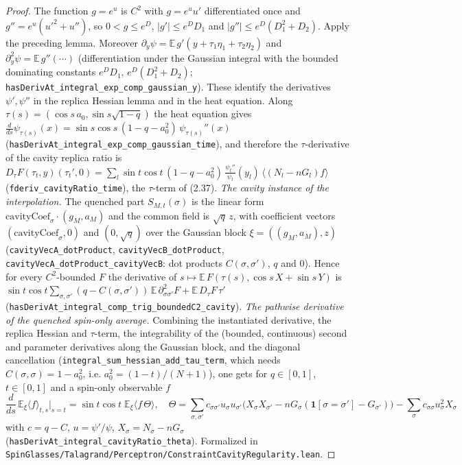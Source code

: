 \begin{proof}
  \leanok
The function $g=e^u$ is $C^2$ with $g=e^u u'$ differentiated once and $g''=e^u(u'^2+u'')$, so $0<g\le e^D$, $|g'|\le e^DD_1$ and $|g''|\le e^D(D_1^2+D_2)$. Apply the preceding lemma.
Moreover $\partial_y\psi=\mathbb E\,g'(y+\tau_1\eta_1+\tau_2\eta_2)$ and $\partial_y^2\psi=\mathbb E\,g''(\cdots)$ (differentiation under the Gaussian integral with the bounded dominating constants $e^DD_1$, $e^D(D_1^2+D_2)$; \texttt{hasDerivAt\_integral\_exp\_comp\_gaussian\_y}). These identify the derivatives $\psi',\psi''$ in the replica Hessian lemma and in the heat equation.
Along $\tau(s)=(\cos s\,a_0,\sin s\sqrt{1-q})$ the heat equation gives $\frac d{ds}\psi_{\tau(s)}(x)=\sin s\cos s\,(1-q-a_0^2)\,\psi_{\tau(s)}''(x)$ (\texttt{hasDerivAt\_integral\_exp\_comp\_gaussian\_time}), and therefore the $\tau$-derivative of the cavity replica ratio is $D_\tau F(\tau_t,y)(\tau_t',0)=\sum_l\sin t\cos t\,(1-q-a_0^2)\,\frac{\psi_t''}{\psi_t}(y_l)\,\langle(N_l-nG_l)f\rangle$ (\texttt{fderiv\_cavityRatio\_time}), the $\tau$-term of (2.37).
\emph{The cavity instance of the interpolation.} The quenched part $S_{M,t}(\sigma)$ is the linear form $\mathrm{cavityCoef}_\sigma\cdot(g_M,a_M)$ and the common field is $\sqrt q\,z$, with coefficient vectors $(\mathrm{cavityCoef}_\sigma,0)$ and $(0,\sqrt q)$ over the Gaussian block $\xi=((g_M,a_M),z)$ (\texttt{cavityVecA\_dotProduct}, \texttt{cavityVecB\_dotProduct}, \texttt{cavityVecA\_dotProduct\_cavityVecB}: dot products $C(\sigma,\sigma')$, $q$ and $0$). Hence for every $C^2$-bounded $F$ the derivative of $s\mapsto\mathbb E\,F(\tau(s),\cos s\,X+\sin s\,Y)$ is $\sin t\cos t\sum_{\sigma,\sigma'}(q-C(\sigma,\sigma'))\,\mathbb E\,\partial^2_{\sigma\sigma'}F+\mathbb E\,D_\tau F\,\tau'$ (\texttt{hasDerivAt\_integral\_comp\_trig\_boundedC2\_cavity}).
\emph{The pathwise derivative of the quenched spin-only average.} Combining the instantiated derivative, the replica Hessian and $\tau$-term, the integrability of the (bounded, continuous) second and parameter derivatives along the Gaussian block, and the diagonal cancellation (\texttt{integral\_sum\_hessian\_add\_tau\_term}, which needs $C(\sigma,\sigma)=1-a_0^2$, i.e. $a_0^2=(1-t)/(N+1)$), one gets for $q\in[0,1]$, $t\in[0,1]$ and a spin-only observable $f$
\[
\frac d{ds}\,\mathbb E_\xi\langle f\rangle_{t,s}\Big|_{s=t}=\sin t\cos t\;\mathbb E_\xi\bigl\langle f\,\Theta\bigr\rangle,\quad \Theta=\sum_{\sigma,\sigma'}c_{\sigma\sigma'}u_\sigma u_{\sigma'}\bigl(X_\sigma X_{\sigma'}-nG_\sigma(\mathbf 1[\sigma=\sigma']-G_{\sigma'})\bigr)-\sum_\sigma c_{\sigma\sigma}u_\sigma^2X_\sigma
\]
with $c=q-C$, $u=\psi'/\psi$, $X_\sigma=N_\sigma-nG_\sigma$ (\texttt{hasDerivAt\_integral\_cavityRatio\_theta}).
Formalized in \texttt{SpinGlasses/Talagrand/Perceptron/ConstraintCavityRegularity.lean}.
\end{proof}

